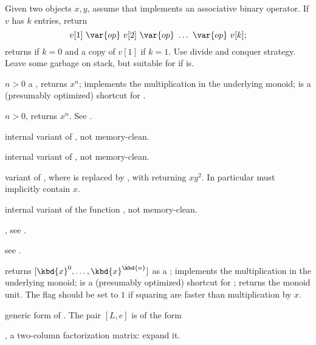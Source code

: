 Given two objects $x,y$, assume that  implements an
associative binary operator. If $v$ has $k$ entries, return
$$v[1]~\var{op}~v[2]~\var{op}~\ldots ~\var{op}~v[k];$$
returns  if $k = 0$ and a copy of $v[1]$ if $k = 1$.
Use divide and conquer strategy. Leave some garbage on stack, but suitable for
 if  is.

 $n > 0$ a
, returns $x^n$;  implements the multiplication
in the underlying monoid;  is a (presumably optimized) shortcut for
.

 $n > 0$,
returns $x^n$. See .

internal variant of , not memory-clean.

internal variant of , not memory-clean.

 variant
of , where  is replaced by , with
 returning $xy^2$. In particular  must implicitly
contain $x$.

internal variant of the function , not memory-clean.

, see
.

see .

returns $[\kbd{x}^0, \dots, \kbd{x}^\kbd{n}]$ as a ;  implements the multiplication in the underlying monoid; 
is a (presumably optimized) shortcut for ; 
returns the monoid unit. The flag  should be set to $1$ if
squaring are faster than multiplication by $x$.

 generic form
of . The pair $[L,e]$ is of the form

\item \kbd{[fa, NULL]},  a two-column factorization matrix: expand it.

